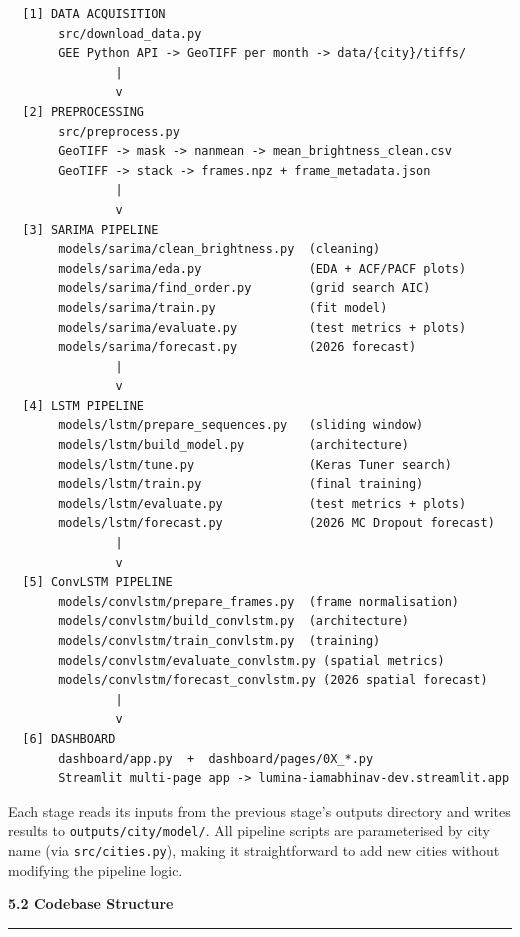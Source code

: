\documentclass[12pt,a4paper]{report}
\begin{document}
\begin{verbatim}
  [1] DATA ACQUISITION
       src/download_data.py
       GEE Python API -> GeoTIFF per month -> data/{city}/tiffs/
               |
               v
  [2] PREPROCESSING
       src/preprocess.py
       GeoTIFF -> mask -> nanmean -> mean_brightness_clean.csv
       GeoTIFF -> stack -> frames.npz + frame_metadata.json
               |
               v
  [3] SARIMA PIPELINE
       models/sarima/clean_brightness.py  (cleaning)
       models/sarima/eda.py               (EDA + ACF/PACF plots)
       models/sarima/find_order.py        (grid search AIC)
       models/sarima/train.py             (fit model)
       models/sarima/evaluate.py          (test metrics + plots)
       models/sarima/forecast.py          (2026 forecast)
               |
               v
  [4] LSTM PIPELINE
       models/lstm/prepare_sequences.py   (sliding window)
       models/lstm/build_model.py         (architecture)
       models/lstm/tune.py                (Keras Tuner search)
       models/lstm/train.py               (final training)
       models/lstm/evaluate.py            (test metrics + plots)
       models/lstm/forecast.py            (2026 MC Dropout forecast)
               |
               v
  [5] ConvLSTM PIPELINE
       models/convlstm/prepare_frames.py  (frame normalisation)
       models/convlstm/build_convlstm.py  (architecture)
       models/convlstm/train_convlstm.py  (training)
       models/convlstm/evaluate_convlstm.py (spatial metrics)
       models/convlstm/forecast_convlstm.py (2026 spatial forecast)
               |
               v
  [6] DASHBOARD
       dashboard/app.py  +  dashboard/pages/0X_*.py
       Streamlit multi-page app -> lumina-iamabhinav-dev.streamlit.app
\end{verbatim}

Each stage reads its inputs from the previous stage's outputs directory and writes results to \texttt{outputs/{city}/{model}/}. All pipeline scripts are parameterised by city name (via \texttt{src/cities.py}), making it straightforward to add new cities without modifying the pipeline logic.

\vspace{0.5cm}
\begin{center}
    \hypertarget{sec:s52}{}%
    {\large \textbf{5.2 Codebase Structure}}\\[0.3cm]
    \noindent\rule{\linewidth}{0.4pt}\\[0.5cm]
\end{center}
\end{document}
